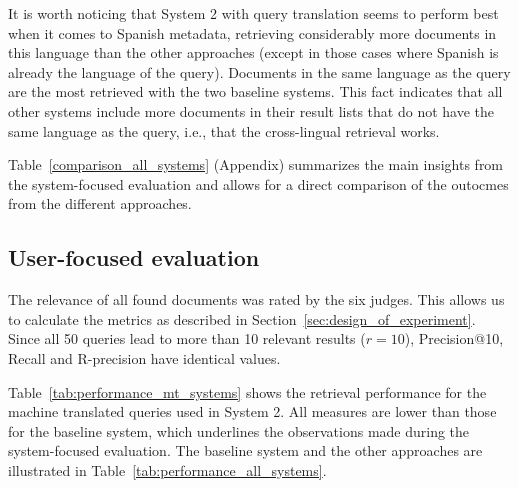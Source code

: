 \documentclass[a4paper,11pt]{article}
\begin{document}
It is worth noticing that System 2 with query translation seems to perform best when it comes to Spanish metadata, retrieving considerably more documents in this language than the other approaches (except in those cases where Spanish is already the language of the query). Documents in the same language as the query are the most retrieved with the two baseline systems. This fact indicates that all other systems include more documents in their result lists that do not have the same language as the query, i.e., that the cross-lingual retrieval works.



Table~\ref{comparison_all_systems} (Appendix) summarizes the main insights from the system-focused evaluation and allows for a direct comparison of the outocmes from the different approaches.












\subsection{User-focused evaluation}
\label{results}
The relevance of all found documents was rated by the six judges. This allows us to calculate the metrics as described in Section~\ref{sec:design_of_experiment}. Since all 50 queries lead to more than 10 relevant results ($r = 10$), Precision@10, Recall and R-precision have identical values.

Table~\ref{tab:performance_mt_systems} shows the retrieval performance for the machine translated queries used in System 2. All measures are lower than those for the baseline system, which underlines the observations made during the system-focused evaluation. The baseline system and the other approaches are illustrated in Table~\ref{tab:performance_all_systems}.
\end{document}
